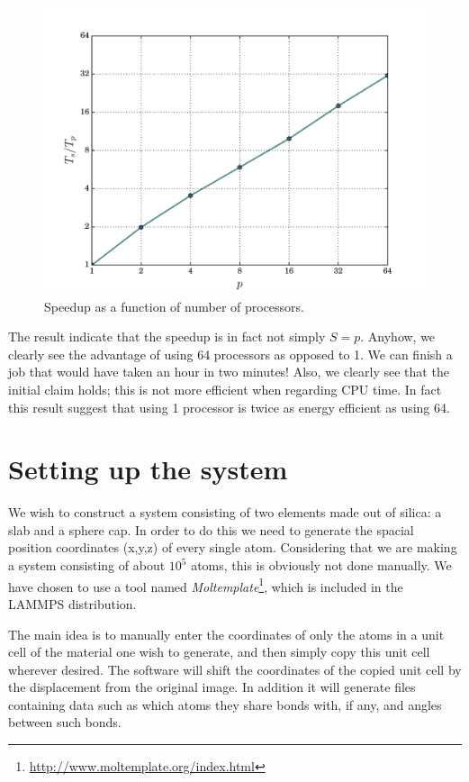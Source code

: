 \documentclass[twoside,english]{uiofysmaster}
\begin{document}
\begin{figure}[H]
\centering
\includegraphics[width=0.7\linewidth]{figures/speedup/15x15.pdf}
\caption{Speedup as a function of number of processors.}
\label{fig:speedup15x15}
\end{figure}

The result indicate that the speedup is in fact not simply $S=p$. 
Anyhow, we clearly see the advantage of using 64 processors as opposed to 1. 
We can finish a job that would have taken an hour in two minutes!
Also, we clearly see that the initial claim holds; this is not more efficient when regarding CPU time. In fact this result suggest that using 1 processor is twice as energy efficient as using 64. 
 





\chapter{Setting up the system}

We wish to construct a system consisting of {\color{red} two} elements made out of silica: a slab and a sphere cap. In order to do this we need to generate the spacial position coordinates (x,y,z) of every single atom. Considering that we are making a system consisting of about $10^5$ atoms, this is obviously not done manually. We have chosen to use a tool named \textit{Moltemplate}\footnote{\href{http://www.moltemplate.org/index.html}{http://www.moltemplate.org/index.html}}, which is included in the LAMMPS distribution.

The main idea is to manually enter the coordinates of only the atoms in a unit cell of the material one wish to generate, and then simply copy this unit cell wherever desired. The software will shift the coordinates of the copied unit cell by the displacement from the original image. In addition it will generate files containing data such as which atoms they share bonds with, if any, and angles between such bonds. 
\end{document}
